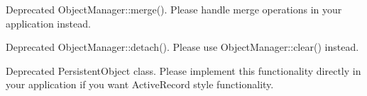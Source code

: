 
\begin{DoxyItemize}
\item Deprecated {\ttfamily Object\+Manager\+::merge()}. Please handle merge operations in your application instead.
\item Deprecated {\ttfamily Object\+Manager\+::detach()}. Please use {\ttfamily Object\+Manager\+::clear()} instead.
\item Deprecated {\ttfamily Persistent\+Object} class. Please implement this functionality directly in your application if you want Active\+Record style functionality. 
\end{DoxyItemize}